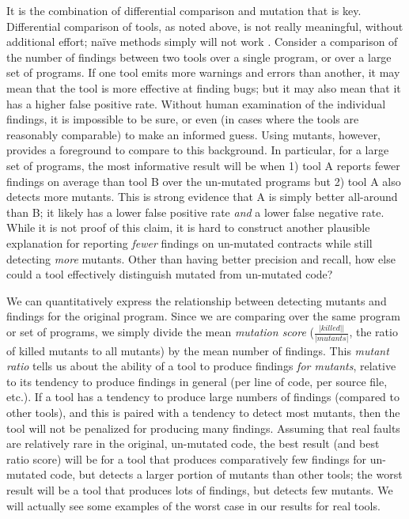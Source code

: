 It is the combination of differential comparison and mutation that is key.  Differential comparison of tools, as noted above, is not really meaningful, without additional effort; na\"ive methods simply will not work \cite{regehrRandom}.  Consider a comparison of the number of findings between two tools over a single program, or over a large set of programs.  If one tool emits more warnings and errors than another, it may mean that the tool is more effective at finding bugs; but it may also mean that it has a higher false positive rate.  Without human examination of the individual findings, it is impossible to be sure, or even (in cases where the tools are reasonably comparable) to make an informed guess.  Using mutants, however, provides a foreground to compare to this background.  In particular, for a large set of programs, the most informative result will be when 1) tool A reports fewer findings on average than tool B over the un-mutated programs but 2) tool A also detects more mutants.  This is strong evidence that A is simply better all-around than B; it likely has a lower false positive rate \emph{and} a lower false negative rate.  While it is not proof of this claim, it is hard to construct another plausible explanation for reporting \emph{fewer} findings on un-mutated contracts while still detecting \emph{more} mutants.  Other than having better precision and recall, how else could a tool effectively distinguish mutated from un-mutated code?

We can quantitatively express the relationship between detecting mutants and findings for the original program.  Since we are comparing over the same program or set of programs, we simply divide the mean \emph{mutation score} ($\frac{|\mathit{killed}||}{|\mathit{mutants}|}$, the ratio of killed mutants to all mutants) by the mean number of findings.  This \emph {mutant ratio} tells us about the ability of a tool to produce findings \emph{for mutants}, relative to its tendency to produce findings in general (per line of code, per source file, etc.).  If a tool has a tendency to produce large numbers of findings (compared to other tools), and this is paired with a tendency to detect most mutants, then the tool will not be penalized for producing many findings.  Assuming that real faults are relatively rare in the original, un-mutated code, the best result (and best ratio score) will be for a tool that produces comparatively few findings for un-mutated code, but detects a larger portion of mutants than other tools; the worst result will be a tool that produces lots of findings, but detects few mutants.  We will actually see some examples of the worst case in our results for real tools.

